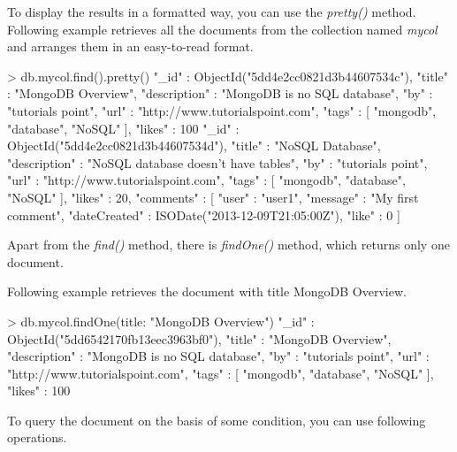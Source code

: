 \documentclass[12pt]{article}
\begin{document}
To display the results in a formatted way, you can use the
\emph{pretty()} method. Following example retrieves all the documents
from the collection named \emph{mycol} and arranges them in an
easy-to-read format.

\begin{bashcode}
> db.mycol.find().pretty()
{
    "_id" : ObjectId("5dd4e2cc0821d3b44607534c"),
    "title" : "MongoDB Overview",
    "description" : "MongoDB is no SQL database",
    "by" : "tutorials point",
    "url" : "http://www.tutorialspoint.com",
    "tags" : [
        "mongodb",
        "database",
        "NoSQL"
    ],
    "likes" : 100
}
{
    "_id" : ObjectId("5dd4e2cc0821d3b44607534d"),
    "title" : "NoSQL Database",
    "description" : "NoSQL database doesn't have tables",
    "by" : "tutorials point",
    "url" : "http://www.tutorialspoint.com",
    "tags" : [
        "mongodb",
        "database",
        "NoSQL"
    ],
    "likes" : 20,
    "comments" : [
        {
            "user" : "user1",
            "message" : "My first comment",
            "dateCreated" : ISODate("2013-12-09T21:05:00Z"),
            "like" : 0
        }
    ]
}
\end{bashcode}

Apart from the \emph{find()} method, there is \emph{findOne()} method,
which returns only one document.

Following example retrieves the document with title MongoDB Overview.

\begin{bashcode}
> db.mycol.findOne({title: "MongoDB Overview"})
{
    "_id" : ObjectId("5dd6542170fb13eec3963bf0"),
    "title" : "MongoDB Overview",
    "description" : "MongoDB is no SQL database",
    "by" : "tutorials point",
    "url" : "http://www.tutorialspoint.com",
    "tags" : [
        "mongodb",
        "database",
        "NoSQL"
    ],
    "likes" : 100
}
\end{bashcode}

To query the document on the basis of some condition, you can use following operations.
\end{document}
